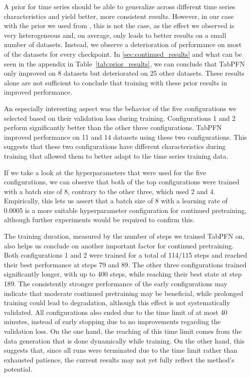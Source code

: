 A prior for time series should be able to generalize across different time series characteristics and yield better, more consistent results.
However, in our case with the prior we used from \citet{dooley2023forecastpfn}, this is not the case, as the effect we observed is very heterogeneous and, on average, only leads to better results on a small number of datasets.
Instead, we observe a deterioration of performance on most of the datasets for every checkpoint.
In \ref{sec:continued_results} and what can be seen in the appendix in Table~\ref{tab:prior_results}, we can conclude that TabPFN only improved on 8 datasets but deteriorated on 25 other datasets.
These results alone are not sufficient to conclude that training with these prior results in improved performance.

An especially interesting aspect was the behavior of the five configurations we selected based on their validation loss during training.
Configurations 1 and 2 perform significantly better than the other three configurations.
TabPFN improved performance on 11 and 14 datasets using these two configurations.
This suggests that these two configurations have different characteristics during training that allowed them to better adapt to the time series training data.

If we take a look at the hyperparameters that were used for the five configurations, we can observe that both of the top configurations were trained with a batch size of 8, contrary to the other three, which used 2 and 4.
Empirically, this lets us assert that a batch size of 8 with a learning rate of 0.0005 is a more suitable hyperparameter configuration for continued pretraining, although further experiments would be required to confirm this.

The training duration, measured by the number of steps we trained TabPFN on, also helps us conclude on another important factor for continued pretraining.
Both configurations 1 and 2 were trained for a total of 114/115 steps and reached their best performance at steps 79 and 89.
The other three configurations trained significantly longer, with up to 400 steps, while reaching their best state at step 189.
The consistently stronger performance of the early configurations may indicate that moderate continued pretraining may be beneficial, while prolonged training could lead to degradation, although this effect is not systematically validated.
\newline
All configurations also ended due to the time limit of at most 40 minutes, instead of early stopping due to no improvements regarding the validation loss.
On the one hand, the reaching of this time limit comes from the data generation that is done dynamically while training.
On the other hand, this suggests that, since all runs were terminated due to the time limit rather than exhausted patience, the current results may not yet fully reflect the method’s potential.


